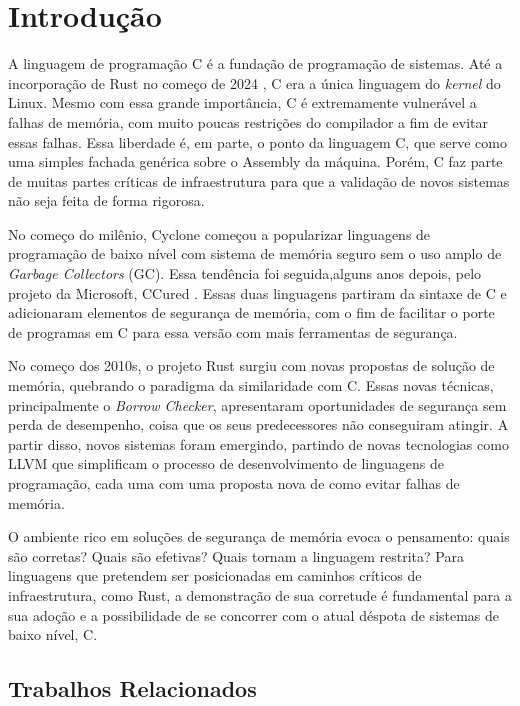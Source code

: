\chapter{Introdução}

A linguagem de programação C \cite{CLANG} é a fundação de programação de sistemas. Até a incorporação de Rust no começo de 2024 \cite{RUSTFORLINUX}, C era a única linguagem do \emph{kernel} do Linux. Mesmo com essa grande importância, C é extremamente vulnerável a falhas de memória, com muito poucas restrições do compilador a fim de evitar essas falhas. Essa liberdade é, em parte, o ponto da linguagem C, que serve como uma simples fachada genérica sobre o Assembly da máquina. Porém, C faz parte de muitas partes críticas de infraestrutura para que a validação de novos sistemas não seja feita de forma rigorosa. 

No começo do milênio, Cyclone \cite{CYCLONE1} começou a popularizar linguagens de programação de baixo nível com sistema de memória seguro sem o uso amplo de \emph{Garbage Collectors} (GC). Essa tendência foi seguida,alguns anos depois, pelo projeto da Microsoft, CCured \cite{CCURED}. Essas duas linguagens partiram da sintaxe de C e adicionaram elementos de segurança de memória, com o fim de facilitar o porte de programas em C para essa versão com mais ferramentas de segurança.

No começo dos 2010s, o projeto Rust \cite{RUSTBOOK} surgiu com novas propostas de solução de memória, quebrando o paradigma da similaridade com C. Essas novas técnicas, principalmente o \emph{Borrow Checker}, apresentaram oportunidades de segurança sem perda de desempenho, coisa que os seus predecessores não conseguiram atingir. A partir disso, novos sistemas foram emergindo, partindo de novas tecnologias como LLVM \cite{LLVM} que simplificam o processo de desenvolvimento de linguagens de programação, cada uma com uma proposta nova de como evitar falhas de memória.

O ambiente rico em soluções de segurança de memória evoca o pensamento: quais são corretas? Quais são efetivas? Quais tornam a linguagem restrita? Para linguagens que pretendem ser posicionadas em caminhos críticos de infraestrutura, como Rust, a demonstração de sua corretude é fundamental para a sua adoção e a possibilidade de se concorrer com o atual déspota de sistemas de baixo nível, C.

\section{Trabalhos Relacionados}


